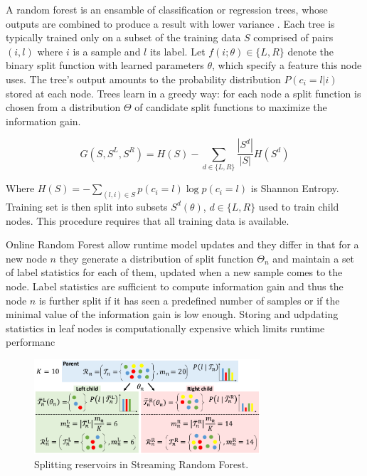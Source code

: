 \documentclass{llncs}
\begin{document}
  A random forest is an ensamble of classification or regression trees, whose outputs are combined to produce a result with lower variance \cite{murphy}. Each tree is typically trained only on a subset of the training data $S$ comprised of pairs $(i, l)$ where $i$ is a sample and $l$ its label.  Let $f(i; \theta) \in \{L, R\}$ denote the binary split function with learned parameters $\theta$, which specify a feature this node uses. The tree's output amounts to the probability distribution $P(c_i = l | i)$ stored at each node. Trees learn in a greedy way: for each node a split function is chosen from a distribution $\Theta$ of candidate split functions to maximize the information gain. 
  
  \begin{equation} \label{eq:infogain}
   G(S, S^L, S^R) = H(S) - \sum_{d \in \{L, R\}} \frac{|S^d|}{|S|}H(S^d)
  \end{equation}
  
  Where $H(S) = - \sum_{(l, i) \in S} p(c_i = l) \log{p(c_i = l)}$ is Shannon Entropy. Training set is then split into subsets $S^d(\theta)$, $d \in \{L, R\}$ used to train child nodes. This procedure requires that all training data is available.
  
  Online Random Forest \cite{online_forest} allow runtime model updates and they differ in that for a new node $n$ they generate a distribution of split function $\Theta_n$ and maintain a set of label statistics for each of them, updated when a new sample comes to the node. Label statistics are sufficient to compute information gain and thus the node $n$ is further split if it has seen a predefined number of samples or if the minimal value of the information gain is low enough. Storing and udpdating statistics in leaf nodes is computationally expensive which limits runtime performanc
  
\begin{figure}[!ht]
  \center
  \includegraphics[width=0.75\textwidth]{figures/forest}
  \caption{Splitting reservoirs in Streaming Random Forest.}
  \label{fig:forest}
\end{figure}
  
\end{document}
